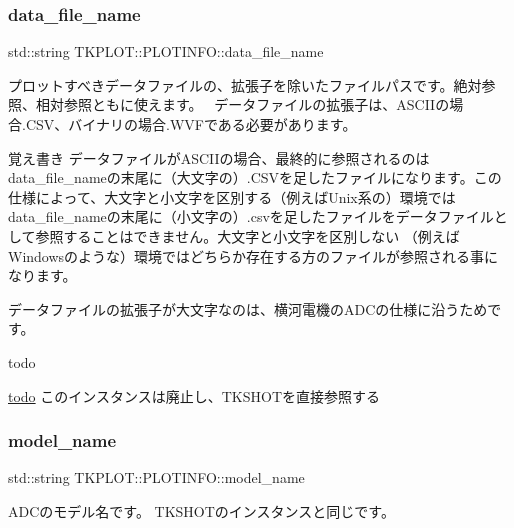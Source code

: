 \subsubsection{\texorpdfstring{data\+\_\+file\+\_\+name}{data\_file\_name}}
{\footnotesize\ttfamily std\+::string T\+K\+P\+L\+O\+T\+::\+P\+L\+O\+T\+I\+N\+F\+O\+::data\+\_\+file\+\_\+name}



プロットすべきデータファイルの、拡張子を除いたファイルパスです。絶対参照、相対参照ともに使えます。~\newline
 データファイルの拡張子は、\+A\+S\+C\+I\+Iの場合.\+C\+S\+V、バイナリの場合.\+W\+V\+Fである必要があります。 

\begin{DoxyNote}{覚え書き}
データファイルが\+A\+S\+C\+I\+Iの場合、最終的に参照されるのは data\+\_\+file\+\_\+nameの末尾に（大文字の）.\+C\+S\+Vを足したファイルになります。この仕様によって、大文字と小文字を区別する（例えば\+Unix系の）環境では data\+\_\+file\+\_\+nameの末尾に（小文字の）.\+csvを足したファイルをデータファイルとして参照することはできません。大文字と小文字を区別しない （例えば\+Windowsのような）環境ではどちらか存在する方のファイルが参照される事になります。 

データファイルの拡張子が大文字なのは、横河電機の\+A\+D\+Cの仕様に沿うためです。 
\end{DoxyNote}
\begin{DoxyRefDesc}{todo}
\item[\hyperlink{todo__todo000005}{todo}]このインスタンスは廃止し、\+T\+K\+S\+H\+O\+Tを直接参照する \end{DoxyRefDesc}
\mbox{\label{class_t_k_p_l_o_t_1_1_p_l_o_t_i_n_f_o_ae98bf84fdf14074b4f7804f0617aa902}} 
\subsubsection{\texorpdfstring{model\+\_\+name}{model\_name}}
{\footnotesize\ttfamily std\+::string T\+K\+P\+L\+O\+T\+::\+P\+L\+O\+T\+I\+N\+F\+O\+::model\+\_\+name}



A\+D\+Cのモデル名です。 T\+K\+S\+H\+O\+Tのインスタンスと同じです。 

